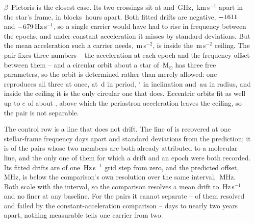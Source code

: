 $\beta$~Pictoris is the closest case. Its two crossings sit at \TjBpNuLo{}
and \TjBpNuHi\,GHz, \TjBpDvKms\,km\,s$^{-1}$ apart in the star's frame, in
blocks \TjBpDtH\,hours apart. Both fitted drifts are negative,
$-1611$ and $-679$\,Hz\,s$^{-1}$, so a single carrier would
have had to rise in frequency between the epochs, and under constant
acceleration it misses by \TjBpNSig{} standard deviations. But the mean
acceleration such a carrier needs, \TjBpAccelReq\,m\,s$^{-2}$, is inside the
\WdAGrid\,m\,s$^{-2}$ ceiling. The pair fixes three numbers -- the
acceleration at each epoch and the frequency offset between them -- and a
circular orbit about a star of \EcMassBp\,M$_\odot$ \citep{Crifo1997} has
three free parameters, so the orbit is determined rather than merely allowed:
one reproduces all three at once, at \ObDayBp\,d in period,
\ObIncBp$^\circ$ in inclination and \ObAuBp\,au in radius, and inside the
ceiling it is the only circular one that does. Eccentric orbits fit as well
up to $e$ of about \ObEccMaxBp, above which the periastron acceleration
leaves the ceiling, so the pair is not separable.

The control row is a line that does not drift. The \TjCtlLine{} line of
\TjCtlStar{} is recovered at one stellar-frame frequency \TjCtlDtD{} days
apart and \TjCtlNSig{} standard deviations from the prediction; it is
\TjNCandAttrTest{} of the \TjNCandAttr{} pairs whose two members are both
already attributed to a molecular line, and the only one of them for which a
drift and an epoch were both recorded. Its fitted drifts are
\TjCtlDriftStep{} of one \TjCtlStepHzS\,Hz\,s$^{-1}$ grid step from zero, and
the predicted offset, \TjCtlPredMHz\,MHz, is below the comparison's own
resolution over the same interval, \TjCtlResMHz\,MHz. Both scale with the
interval, so the comparison resolves a mean drift to
\TjCtlDriftResHzS\,Hz\,s$^{-1}$ and no finer at any baseline. For the
\TjNOpen{} pairs it cannot separate -- \TjNPowerOpen{} of them resolved and
failed by the constant-acceleration comparison -- \TjDtOpenMinD{} days to
nearly two years apart, nothing measurable tells one carrier from two.

\begin{table}
\caption{The \WdNExc{} above-trigger readings of the widened recurrence
window, taken to the pairs the trajectory test is asked of. Each block of
rows is the one above it with one effect removed; the counts in the lower
block are those of Table~\ref{tab:pairs}.}
\label{tab:pairacct}
\footnotesize

\end{table}

